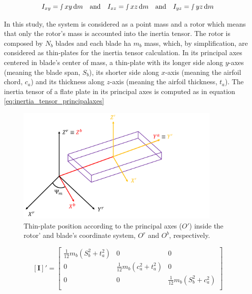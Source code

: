 \begin{equation}
    I_{xy} = \smallint  xy \, \mathrm{d}m \quad \text{and} \quad I_{xz} = \smallint  xz \, \mathrm{d}m \quad \text{and} \quad I_{yz} = \smallint  yz \, \mathrm{d}m
    \label{eq:ele_tensor_inertia2}
\end{equation}

In this study, the system is considered as a point mass and a rotor which means that only the rotor's mass is accounted into the inertia tensor. The rotor is composed by $N_b$ blades and each blade ha $m_b$ mass, which, by simplification, are considered as thin-plates for the inertia tensor calculation. In its principal axes centered in blade's center of mass, a thin-plate with its longer side along $y$-axes (meaning the blade span, $S_b$), its shorter side along $x$-axis (meaning the airfoil chord, $c_a$) and its thickness along $z$-axis (meaning the airfoil thickness, $t_a$). The inertia tensor of a flate plate in its principal axes is computed as in equation \ref{eq:inertia_tensor_principalaxes}

\begin{figure}[!htb]
    \centering
    \includegraphics[width=10cm]{Figures/background/inertia/inertia_scheme.png}
    \caption{Thin-plate position according to the principal axes ($O'$) inside the rotor' and blade's coordinate system, $O^r$ and $O^b$, respectively.}
    \label{fig:Inertia}
\end{figure}

\begin{equation}
    \left[\mathbf{I}\right]' = 
    \begin{bmatrix}
        \frac{1}{12}m_b(S_b^2+t_a^2) & 0 & 0\\
        0 & \frac{1}{12}m_b(c_a^2+t_a^2) & 0\\
        0 & 0 & \frac{1}{12}m_b(S_b^2+c_a^2)\\
    \end{bmatrix}
    \label{eq:inertia_tensor_principalaxes}
\end{equation}


